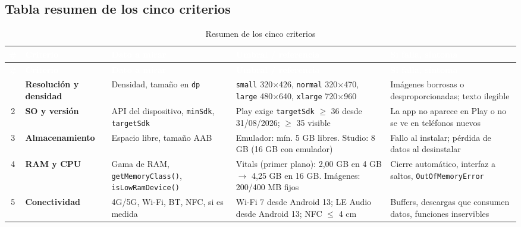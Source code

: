 \documentclass[11pt,a4paper]{article}
\newcommand{\code}[1]{\texttt{\color{primary}#1}}
\begin{document}
	\subsection{Tabla resumen de los cinco criterios}
	
	{\footnotesize
		\begin{xltabular}{\textwidth}{@{}c >{\RaggedRight\arraybackslash}p{2.2cm} >{\RaggedRight\arraybackslash}p{3.3cm} >{\RaggedRight\arraybackslash}p{3.5cm} >{\RaggedRight\arraybackslash}X@{}}
			\caption{Resumen de los cinco criterios}\label{tab:resumen}\\
			\toprule
			\textcolor{white}{\sffamily\bfseries \#} & \textcolor{white}{\sffamily\bfseries Criterio} & \textcolor{white}{\sffamily\bfseries Dato a mirar} & \textcolor{white}{\sffamily\bfseries Umbral / referencia} & \textcolor{white}{\sffamily\bfseries Si falla, síntoma} \\
			\midrule
			\endfirsthead
			\toprule
			\textcolor{white}{\sffamily\bfseries \#} & \textcolor{white}{\sffamily\bfseries Criterio} & \textcolor{white}{\sffamily\bfseries Dato a mirar} & \textcolor{white}{\sffamily\bfseries Umbral / referencia} & \textcolor{white}{\sffamily\bfseries Si falla, síntoma} \\
			\midrule
			\endhead
			\bottomrule
			 & \textbf{Resolución y densidad} & Densidad, tamaño en \code{dp} & \code{small} 320$\times$426, \code{normal} 320$\times$470, \code{large} 480$\times$640, \code{xlarge} 720$\times$960 & Imágenes borrosas o desproporcionadas; texto ilegible \\
			2 & \textbf{SO y versión} & API del dispositivo, \code{minSdk}, \code{targetSdk} & Play exige \code{targetSdk} $\geq$ 36 desde 31/08/2026; $\geq$ 35 visible & La app no aparece en Play o no se ve en teléfonos nuevos \\
			3 & \textbf{Almacenamiento} & Espacio libre, tamaño AAB & Emulador: mín. 5 GB libres. Studio: 8 GB (16 GB con emulador) & Fallo al instalar; pérdida de datos al desinstalar \\
			4 & \textbf{RAM y CPU} & Gama de RAM, \code{getMemoryClass()}, \code{isLowRamDevice()} & Vitals (primer plano): 2,00 GB en 4 GB $\to$ 4,25 GB en 16 GB. Imágenes: 200/400 MB fijos & Cierre automático, interfaz a saltos, \code{OutOfMemoryError} \\
			5 & \textbf{Conectividad} & 4G/5G, Wi-Fi, BT, NFC, si es medida & Wi-Fi 7 desde Android 13; LE Audio desde Android 13; NFC $\leq$ 4 cm & Buffers, descargas que consumen datos, funciones inservibles \\
		\end{xltabular}
	}
	
\end{document}
